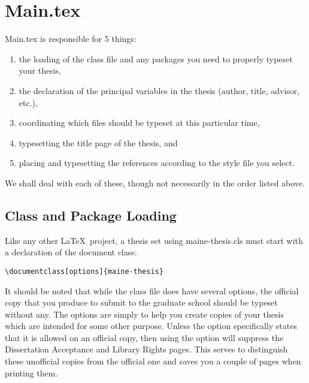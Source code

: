 \chapter{Main.tex}
Main.tex is responsible for 5 things:
\begin{enumerate}
\item{the loading of the class file and any packages you need to properly typeset your thesis,}
\item{the declaration of the principal variables in the thesis (author, title, advisor, etc.),}
\item{coordinating which files should be typeset at this particular time,}
\item{typesetting the title page of the thesis, and}
\item{placing and typesetting the references according to the style file you select.}
\end{enumerate}
We shall deal with each of these, though not necessarily in the order listed above.

\section{Class and Package Loading}\label{class}
Like any other \LaTeX\ project, a thesis set using maine-thesis.cls must start with a declaration of the document class:

\begin{verbatim}
\documentclass[options]{maine-thesis}
\end{verbatim}

It should be noted that while the class file does have several options, the official copy that you produce to submit to the graduate school should be typeset without any.  The options are simply to help you create copies of your thesis which are intended for some other purpose.  Unless the option specifically states that it is allowed on an official copy, then using the option will suppress the Dissertation Acceptance and Library Rights pages.  This serves to distinguish these unofficial copies from the official one and saves you a couple of pages when printing them.


